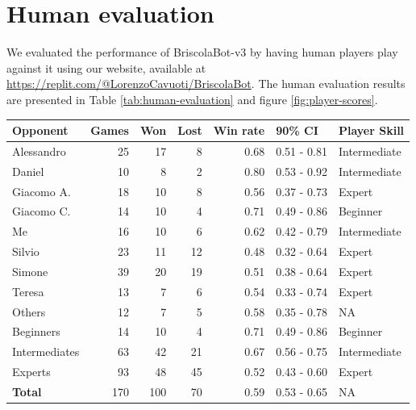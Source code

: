 \section{Human evaluation}
We evaluated the performance of BriscolaBot-v3 by having human players play against it using our website, available at \url{https://replit.com/@LorenzoCavuoti/BriscolaBot}. The human evaluation results are presented in Table \ref{tab:human-evaluation} and figure \ref{fig:player-scores}.

\begin{table}[H]
    \begin{tabular}{lrrrrll}
        \hline
            Opponent &  Games &  Won &  Lost &  Win rate &      90\% CI & Player Skill \\
        \hline
          Alessandro &            25 &   17 &     8 &      0.68 & 0.51 - 0.81 & Intermediate \\
              Daniel &            10 &    8 &     2 &      0.80 & 0.53 - 0.92 & Intermediate \\
          Giacomo A. &            18 &   10 &     8 &      0.56 & 0.37 - 0.73 &       Expert \\
          Giacomo C. &            14 &   10 &     4 &      0.71 & 0.49 - 0.86 &     Beginner \\
                  Me &            16 &   10 &     6 &      0.62 & 0.42 - 0.79 & Intermediate \\
              Silvio &            23 &   11 &    12 &      0.48 & 0.32 - 0.64 &       Expert \\
              Simone &            39 &   20 &    19 &      0.51 & 0.38 - 0.64 &       Expert \\
              Teresa &            13 &    7 &     6 &      0.54 & 0.33 - 0.74 &       Expert \\
              Others &            12 &    7 &     5 &      0.58 & 0.35 - 0.78 &           NA \\
        \hline
            Beginners &            14 &   10 &     4 &      0.71 & 0.49 - 0.86 &     Beginner \\
              
        Intermediates &            63 &   42 &    21 &      0.67 & 0.56 - 0.75 & Intermediate \\
        Experts &            93 &   48 &    45 &      0.52 & 0.43 - 0.60 &       Expert \\
        \hline
               \textbf{Total} &           170 &  100 &    70 &      0.59 & 0.53 - 0.65 &           NA \\
        \hline
        \end{tabular}
        

\end{table}

